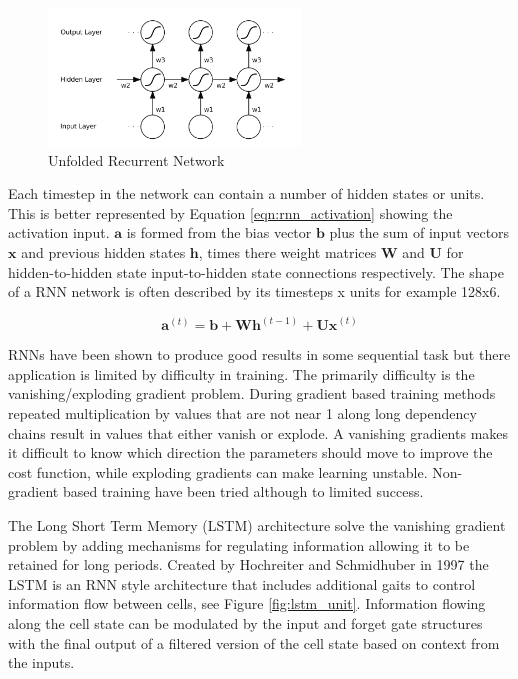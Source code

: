 \documentclass[sensors,article,submit,moreauthors,pdftex]{Definitions/mdpi}
\begin{document}
\begin{figure}[!hbt]
    \centering
    \includegraphics[width=0.6\textwidth]{Figures/lstm/rnn_structure.png}
    \caption{Unfolded Recurrent Network}
    \label{fig:rnn_structure}
\end{figure}

Each timestep in the network can contain a number of hidden states or units. This is better represented by Equation \ref{eqn:rnn_activation} showing the activation input. $\mathbf{a}$ is formed from the bias vector $\mathbf{b}$ plus the sum of input vectors $\mathbf{x}$ and previous hidden states $\mathbf{h}$, times there weight matrices $\mathbf{W}$ and $\mathbf{U}$ for hidden-to-hidden state input-to-hidden state connections respectively.\cite{Goodfellow2015} The shape of a RNN network is often described by its timesteps x units for example 128x6.

\begin{equation}
    \mathbf{a}^{(t)} = \mathbf{b} + \mathbf{Wh}^{(t-1)} + \mathbf{Ux}^{(t)}
    \label{eqn:rnn_activation}
\end{equation}

RNNs have been shown to produce good results in some sequential task but there application is limited by difficulty in training. The primarily difficulty is the vanishing/exploding gradient problem. During gradient based training methods repeated multiplication by values that are not near 1 along long dependency chains result in values that either vanish or explode. A vanishing gradients makes it difficult to know which direction the parameters should move to improve the cost function, while exploding gradients can make learning unstable. Non-gradient based training have been tried although to limited success. \cite{Graves2012, Goodfellow2015}

The Long Short Term Memory (LSTM) architecture solve the vanishing gradient problem by adding mechanisms for regulating information allowing it to be retained for long periods. Created by Hochreiter and Schmidhuber in 1997\cite{Hochreiter1997} the LSTM is an RNN style architecture that includes additional gaits to control information flow between cells, see Figure \ref{fig:lstm_unit}. Information flowing along the cell state can be modulated by the input and forget gate structures with the final output of a filtered version of the cell state based on context from the inputs.\cite{Olah2015}  
\end{document}
